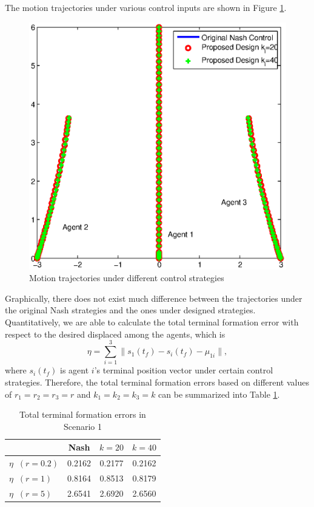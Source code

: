 \documentclass[10pt,doublecolumn]{IEEEtran}  %
\begin{document}
The motion trajectories under various control inputs are shown in Figure \ref{TrajectoryUndirected}.
\begin{figure}[h]
      \centering
      \includegraphics[scale=0.5]{TrajectoryUndirected.eps}
      \caption{Motion trajectories under different control strategies}\label{TrajectoryUndirected}
\end{figure}
Graphically, there does not exist much difference between the trajectories under the original Nash strategies and the ones under designed strategies. Quantitatively, we are able to calculate the total terminal formation error with respect to the desired displaced among the agents, which is
\begin{equation}
\eta=\sum^3_{i=1}\|s_1(t_f)-s_i(t_f)-{\mu_{1i}}\|,
\end{equation}
where $s_i(t_f)$ is agent $i$'s terminal position vector under certain control strategies. Therefore, the total terminal formation errors based on different values of $r_1=r_2=r_3=r$ and $k_1=k_2=k_3=k$ can be summarized into Table \ref{Comparison}.
\begin{table}[h]\normalsize
\centering
\begin{tabular}{|l|c|c|c|}
  \hline
         & Nash & $k=20$ & $k=40$ \\
         \hline
         $\eta\;\;(r=0.2)$ & 0.2162 & 0.2177 & 0.2162 \\
         \hline
  $\eta\;\;(r=1)$ &  0.8164 &  0.8513 & 0.8179 \\
  \hline
  $\eta\;\;(r=5)$ &  2.6541 & 2.6920 & 2.6560 \\
  \hline
\end{tabular}
\caption{Total terminal formation errors in Scenario 1}\label{Comparison}
\end{table}
\end{document}
